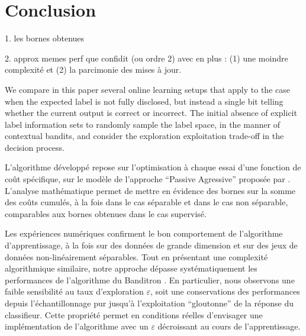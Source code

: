 \documentclass[preprint,12pt,authoryear]{elsarticle}
\begin{document}
\section{Conclusion}
\label{sec:conclusion}

{\color{green}


1. les bornes obtenues

2. approx memes perf que confidit (ou ordre 2) avec en plus : (1) une moindre complexité et (2) la parcimonie des mises à jour. }

We compare in this paper several online learning setups that apply to the case  when the expected label is not fully disclosed, but instead a single bit  telling whether the current output is correct or incorrect. The initial absence of explicit label information sets to randomly sample the label space, in the manner of contextual bandits, and consider the exploration exploitation trade-off in the decision process. 


L'algorithme développé repose  sur l'optimisation à chaque essai d'une fonction de coût spécifique, sur le modèle de l'approche ``Passive Agressive'' proposée par \cite{crammer2006online}. 
L'analyse mathématique permet de mettre en évidence des bornes sur la somme des coûts cumulés, à la fois dans le cas séparable et dans le cas non séparable, comparables aux bornes obtenues dans le cas supervisé.

Les expériences numériques confirment le bon comportement de l'algorithme d'apprentissage, à la fois sur des données de grande dimension et sur des jeux de données non-linéairement séparables. Tout en présentant une complexité algorithmique similaire, notre approche dépasse systématiquement les performances de l'algorithme du Banditron \cite{kakade2008efficient}. En particulier, nous observons une faible sensibilité au taux d'exploration $\varepsilon$, soit une conservations des performances depuis l'échantillonnage pur jusqu'à l'exploitation ``gloutonne'' de la réponse du classifieur. Cette propriété permet en conditions réelles d'envisager une implémentation de l'algorithme avec un $\varepsilon$ décroissant au cours de l'apprentissage.    
\end{document}
